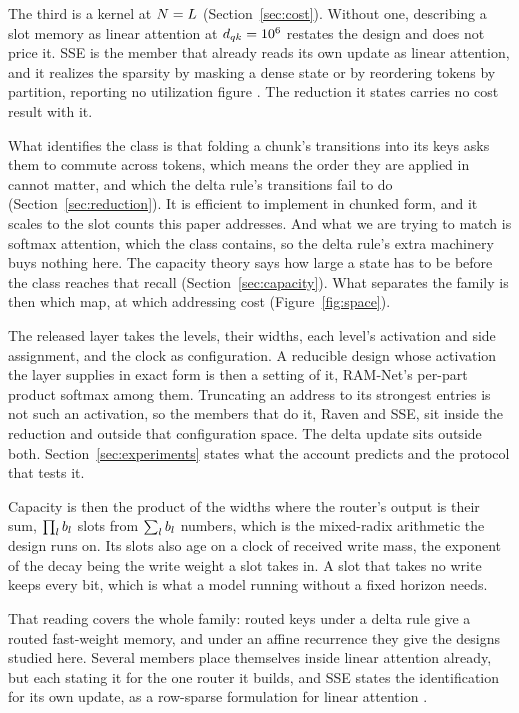 The third is a kernel at $N = L$ (Section~\ref{sec:cost}). Without one, describing a slot memory as linear attention at $d_{qk} = 10^6$ restates the design and does not price it. SSE is the member that already reads its own update as linear attention, and it realizes the sparsity by masking a dense state or by reordering tokens by partition, reporting no utilization figure \citep{sse2025}. The reduction it states carries no cost result with it.

What identifies the class is that folding a chunk's transitions into its keys asks them to commute across tokens, which means the order they are applied in cannot matter, and which the delta rule's transitions fail to do \citep{schlag2021fwp} (Section~\ref{sec:reduction}). It is efficient to implement in chunked form, and it scales to the slot counts this paper addresses. And what we are trying to match is softmax attention, which the class contains, so the delta rule's extra machinery buys nothing here. The capacity theory says how large a state has to be before the class reaches that recall (Section~\ref{sec:capacity}). What separates the family is then which map, at which addressing cost (Figure~\ref{fig:space}).

The released layer takes the levels, their widths, each level's activation and side assignment, and the clock as configuration. A reducible design whose activation the layer supplies in exact form is then a setting of it, RAM-Net's per-part product softmax among them. Truncating an address to its strongest entries is not such an activation, so the members that do it, Raven and SSE, sit inside the reduction and outside that configuration space. The delta update sits outside both. Section~\ref{sec:experiments} states what the account predicts and the protocol that tests it.

Capacity is then the product of the widths where the router's output is their sum, $\prod_l b_l$ slots from $\sum_l b_l$ numbers, which is the mixed-radix arithmetic the design runs on. Its slots also age on a clock of received write mass, the exponent of the decay being the write weight a slot takes in. A slot that takes no write keeps every bit, which is what a model running without a fixed horizon needs.

That reading covers the whole family: routed keys under a delta rule give a routed fast-weight memory, and under an affine recurrence they give the designs studied here. Several members place themselves inside linear attention already, but each stating it for the one router it builds, and SSE states the identification for its own update, as a row-sparse formulation for linear attention \citep{sse2025}.


